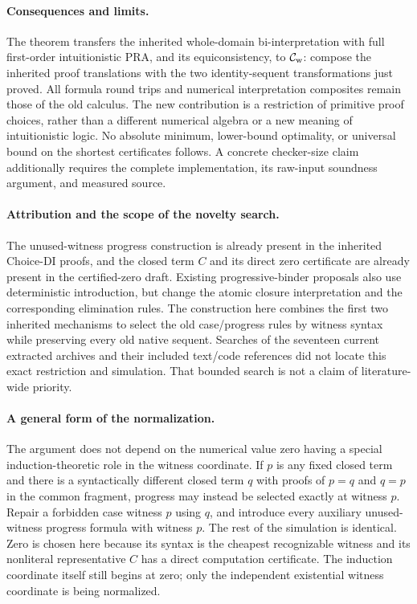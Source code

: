 \paragraph{Consequences and limits.}
The theorem transfers the inherited whole-domain bi-interpretation
with full first-order intuitionistic PRA, and its equiconsistency, to
$\mathcal C_{\rm w}$: compose the inherited proof translations with
the two identity-sequent transformations just proved.  All formula
round trips and numerical interpretation composites remain those of
the old calculus.  The new contribution is a restriction of primitive
proof choices, rather than a different numerical algebra or a new
meaning of intuitionistic logic.  No absolute minimum, lower-bound
optimality, or universal bound on the shortest certificates follows.
A concrete checker-size claim additionally requires the complete
implementation, its raw-input soundness argument, and measured source.

\paragraph{Attribution and the scope of the novelty search.}
The unused-witness progress construction is already present in the
inherited Choice-DI proofs, and the closed term $C$ and its direct zero
certificate are already present in the certified-zero draft.  Existing
progressive-binder proposals also use deterministic introduction, but
change the atomic closure interpretation and the corresponding
elimination rules.  The construction here combines the first two
inherited mechanisms to select the old case/progress rules by witness
syntax while preserving every old native sequent.  Searches of the
seventeen current extracted archives and their included text/code
references did not locate this exact restriction and simulation.
That bounded search is not a claim of literature-wide priority.

\paragraph{A general form of the normalization.}
The argument does not depend on the numerical value zero having a special
induction-theoretic role in the witness coordinate.  If $p$ is any fixed
closed term and there is a syntactically different closed term $q$ with
proofs of $p=q$ and $q=p$ in the common fragment, progress may instead be
selected exactly at witness $p$.  Repair a forbidden case witness $p$
using $q$, and introduce every auxiliary unused-witness progress formula
with witness $p$.  The rest of the simulation is identical.  Zero is
chosen here because its syntax is the cheapest recognizable witness and
its nonliteral representative $C$ has a direct computation certificate.
The induction coordinate itself still begins at zero; only the independent
existential witness coordinate is being normalized.
